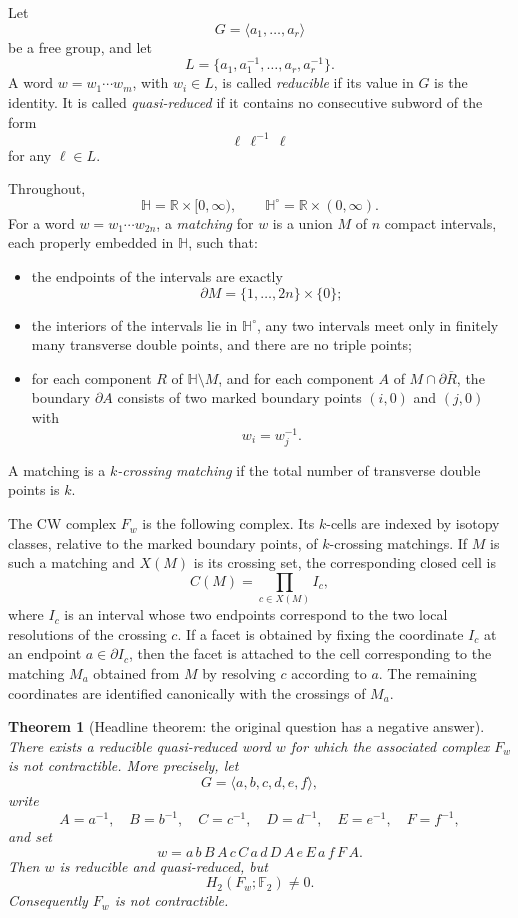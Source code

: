 \documentclass[12pt]{article}
\newcommand{\RR}{\mathbb{R}}
\newcommand{\HH}{\mathbb{H}}
\newcommand{\Ftwo}{\mathbb{F}_2}
\newcommand{\bd}{\partial}
\newtheorem{theorem}{Theorem}
\theoremstyle{definition}
\begin{document}
Let
\[
G=\langle a_1,\dots,a_r\rangle
\]
be a free group, and let
\[
L=\{a_1,a_1^{-1},\dots,a_r,a_r^{-1}\}.
\]
A word \(w=w_1\cdots w_m\), with \(w_i\in L\), is called \emph{reducible} if its value in \(G\) is the identity.  It is called \emph{quasi-reduced} if it contains no consecutive subword of the form
\[
\ell\,\ell^{-1}\,\ell
\]
for any \(\ell\in L\).

Throughout,
\[
\HH=\RR\times[0,\infty),\qquad \HH^\circ=\RR\times(0,\infty).
\]
For a word \(w=w_1\cdots w_{2n}\), a \emph{matching} for \(w\) is a union \(M\) of \(n\) compact intervals, each properly embedded in \(\HH\), such that:
\begin{itemize}
\item the endpoints of the intervals are exactly
\[
\bd M=\{1,\dots,2n\}\times\{0\};
\]
\item the interiors of the intervals lie in \(\HH^\circ\), any two intervals meet only in finitely many transverse double points, and there are no triple points;
\item for each component \(R\) of \(\HH\setminus M\), and for each component \(A\) of \(M\cap\bd\overline{R}\), the boundary \(\bd A\) consists of two marked boundary points \((i,0)\) and \((j,0)\) with
\[
w_i=w_j^{-1}.
\]
\end{itemize}
A matching is a \emph{\(k\)-crossing matching} if the total number of transverse double points is \(k\).

The CW complex \(F_w\) is the following complex.  Its \(k\)-cells are indexed by isotopy classes, relative to the marked boundary points, of \(k\)-crossing matchings.  If \(M\) is such a matching and \(X(M)\) is its crossing set, the corresponding closed cell is
\[
C(M)=\prod_{c\in X(M)} I_c,
\]
where \(I_c\) is an interval whose two endpoints correspond to the two local resolutions of the crossing \(c\).  If a facet is obtained by fixing the coordinate \(I_c\) at an endpoint \(a\in\bd I_c\), then the facet is attached to the cell corresponding to the matching \(M_a\) obtained from \(M\) by resolving \(c\) according to \(a\).  The remaining coordinates are identified canonically with the crossings of \(M_a\).

\begin{theorem}[Headline theorem: the original question has a negative answer]\label{thm:headline}
There exists a reducible quasi-reduced word \(w\) for which the associated complex \(F_w\) is not contractible.  More precisely, let
\[
G=\langle a,b,c,d,e,f\rangle,
\]
write
\[
A=a^{-1},\quad B=b^{-1},\quad C=c^{-1},\quad
D=d^{-1},\quad E=e^{-1},\quad F=f^{-1},
\]
and set
\[
w=a\,b\,B\,A\,c\,C\,a\,d\,D\,A\,e\,E\,a\,f\,F\,A.
\]
Then \(w\) is reducible and quasi-reduced, but
\[
H_2(F_w;\Ftwo)\neq 0.
\]
Consequently \(F_w\) is not contractible.
\end{theorem}
\end{document}
